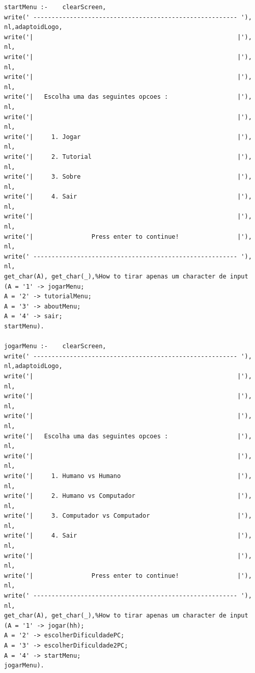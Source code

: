 \documentclass[a4paper]{article}
\begin{document}
\begin{lstlisting}
startMenu :-    clearScreen,
write(' -------------------------------------------------------- '), nl,adaptoidLogo,
write('|                                                        |'), nl,
write('|                                                        |'), nl,
write('|                                                        |'), nl,
write('|   Escolha uma das seguintes opcoes :                   |'), nl,
write('|                                                        |'), nl,
write('|     1. Jogar                                           |'), nl,
write('|     2. Tutorial                                        |'), nl,
write('|     3. Sobre                                           |'), nl,
write('|     4. Sair                                            |'), nl,
write('|                                                        |'), nl,
write('|                Press enter to continue!                |'), nl,
write(' -------------------------------------------------------- '), nl,
get_char(A), get_char(_),%How to tirar apenas um character de input
(A = '1' -> jogarMenu;
A = '2' -> tutorialMenu;
A = '3' -> aboutMenu;
A = '4' -> sair;
startMenu).

jogarMenu :-    clearScreen,
write(' -------------------------------------------------------- '), nl,adaptoidLogo,
write('|                                                        |'), nl,
write('|                                                        |'), nl,
write('|                                                        |'), nl,
write('|   Escolha uma das seguintes opcoes :                   |'), nl,
write('|                                                        |'), nl,
write('|     1. Humano vs Humano                                |'), nl,
write('|     2. Humano vs Computador                            |'), nl,
write('|     3. Computador vs Computador                        |'), nl,
write('|     4. Sair                                            |'), nl,
write('|                                                        |'), nl,
write('|                Press enter to continue!                |'), nl,
write(' -------------------------------------------------------- '), nl,
get_char(A), get_char(_),%How to tirar apenas um character de input
(A = '1' -> jogar(hh);
A = '2' -> escolherDificuldadePC;
A = '3' -> escolherDificuldade2PC;
A = '4' -> startMenu;
jogarMenu).


\end{lstlisting}
\end{document}
